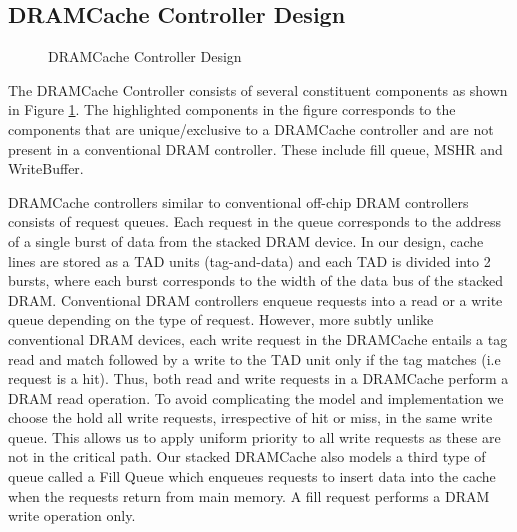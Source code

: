 \subsection{DRAMCache Controller Design}
\begin{figure}[!htb]
	\centering
	\def\svgwidth{\columnwidth}
	
	\caption{DRAMCache Controller Design}
	\label{fig:dramcache-ctrl}
\end{figure}
The DRAMCache Controller consists of several constituent components as shown in Figure \ref{fig:dramcache-ctrl}. The highlighted components in the figure corresponds to the components that are unique/exclusive to a DRAMCache controller and are not present in a conventional DRAM controller. These include fill queue, MSHR and WriteBuffer.
\par DRAMCache controllers similar to conventional off-chip DRAM controllers consists of request queues. Each request in the queue corresponds to the address of a single burst of data from the stacked DRAM device.
In our design, cache lines are stored as a TAD units (tag-and-data) \cite{alloy} and each TAD is divided into 2 bursts, where each burst corresponds to the width of the data bus of the stacked DRAM.
Conventional DRAM controllers enqueue requests into a read or a write queue depending on the type of request. 
However, more subtly unlike conventional DRAM devices, each write request in the DRAMCache entails a tag read and match followed by a write to the TAD unit only if the tag matches (i.e request is a hit). Thus, both read and write requests in a DRAMCache perform a DRAM read operation. To avoid complicating the model and implementation we choose the hold all write requests, irrespective of hit or miss, in the same write queue. This allows us to apply uniform priority to all write requests as these are not in the critical path.
Our stacked DRAMCache also models a third type of queue called a Fill Queue \cite{dca} which enqueues requests to insert data into the cache when the requests return from main memory. A fill request performs a DRAM write operation only. 

